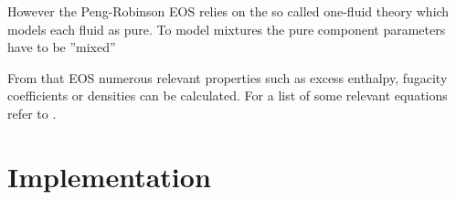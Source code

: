         However the Peng-Robinson EOS relies on the so called one-fluid theory which models each fluid as pure.
        To model mixtures the pure component parameters have to be ''mixed''

        From that EOS numerous relevant properties such as excess enthalpy, fugacity coefficients or densities
        can be calculated. For a list of some relevant equations refer to .

    \section{Implementation}
    \label{sec:mathpro:implementation}
        
